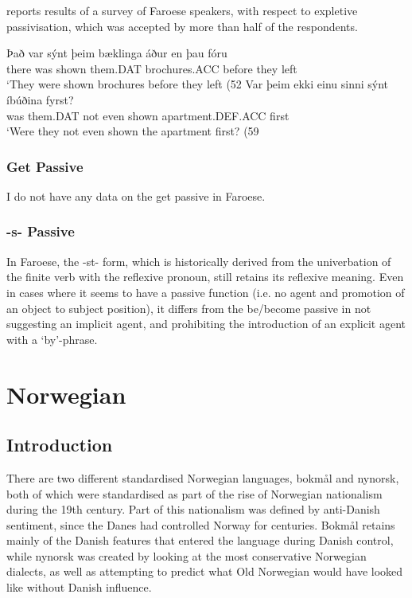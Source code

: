 \cite[ex 41]{Jonsson.2009b} reports results of a survey of Faroese speakers, with respect to expletive passivisation, which was accepted by more than half of the respondents. 
\begin{exe}
\ex 
\begin{xlist}
\ex \gll Það var sýnt þeim bæklinga áður en þau fóru\\
there was shown them.DAT brochures.ACC before they left\\
\trans `They were shown brochures before they left (52%
\ex \gll Var þeim ekki {einu sinni} sýnt íbúðina fyrst?\\
was them.DAT not even shown apartment.DEF.ACC first\\
\trans `Were they not even shown the apartment first? (59%
\end{xlist}
\end{exe}

\subsubsection{Get Passive}
I do not have any data on the get passive in Faroese.

\subsubsection{-s- Passive}
In Faroese, the -st- form, which is historically derived from the univerbation of the finite verb with the reflexive pronoun, still retains its reflexive meaning. Even in cases where it seems to have a passive function (i.e. no agent and promotion of an object to subject position), it differs from the be/become passive in not suggesting an implicit agent, and prohibiting the introduction of an explicit agent with a `by'-phrase.


\section{Norwegian}\label{sec:Norwegian}


\subsection{Introduction}
There are two different standardised Norwegian languages, bokmål and nynorsk, both of which were standardised as part of the rise of Norwegian nationalism during the 19th century. Part of this nationalism was defined by anti-Danish sentiment, since the Danes had controlled Norway for centuries. Bokmål retains mainly of the Danish features that entered the language during Danish control, while nynorsk was created by looking at the most conservative Norwegian dialects, as well as attempting to predict what Old Norwegian would have looked like without Danish influence.

